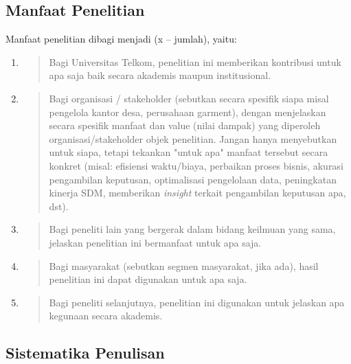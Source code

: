 \hypertarget{manfaat-penelitian}{%
\subsection{Manfaat Penelitian}\label{manfaat-penelitian}}

Manfaat penelitian dibagi menjadi (x -- jumlah), yaitu:

\begin{enumerate}
\def\labelenumi{\arabic{enumi}.}
\item
  \begin{quote}
  Bagi Universitas Telkom, penelitian ini memberikan kontribusi untuk
  apa saja baik secara akademis maupun institusional.
  \end{quote}
\item
  \begin{quote}
  Bagi organisasi / stakeholder (sebutkan secara spesifik siapa misal
  pengelola kantor desa, perusahaan garment), dengan menjelaskan secara
  spesifik manfaat dan value (nilai dampak) yang diperoleh
  organisasi/stakeholder objek penelitian. Jangan hanya menyebutkan
  untuk siapa, tetapi tekankan "untuk apa" manfaat tersebut secara
  konkret (misal: efisiensi waktu/biaya, perbaikan proses bisnis,
  akurasi pengambilan keputusan, optimalisasi pengelolaan data,
  peningkatan kinerja SDM, memberikan \emph{insight} terkait pengambilan
  keputusan apa, dst).
  \end{quote}
\item
  \begin{quote}
  Bagi peneliti lain yang bergerak dalam bidang keilmuan yang sama,
  jelaskan penelitian ini bermanfaat untuk apa saja.
  \end{quote}
\item
  \begin{quote}
  Bagi masyarakat (sebutkan segmen masyarakat, jika ada), hasil
  penelitian ini dapat digunakan untuk apa saja.
  \end{quote}
\item
  \begin{quote}
  Bagi peneliti selanjutnya, penelitian ini digunakan untuk jelaskan apa
  kegunaan secara akademis.
  \end{quote}
\end{enumerate}

\hypertarget{sistematika-penulisan}{%
\subsection{Sistematika Penulisan}\label{sistematika-penulisan}}

